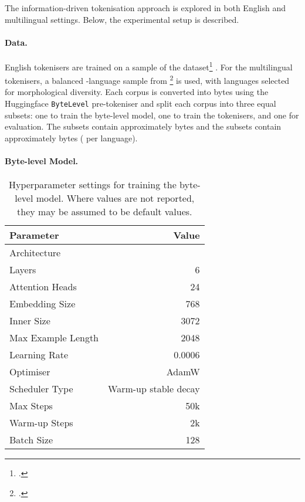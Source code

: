 The information-driven tokenisation approach is explored in both English and multilingual settings. Below, the experimental setup is described.

\paragraph{Data.} 
English tokenisers are trained on a sample of the \fineweb dataset\footnote{\href{https://huggingface.co/datasets/HuggingFaceFW/fineweb-edu}{}.} \citep{penedo2024finewebdatasetsdecantingweb}.
For the multilingual tokenisers, a balanced -language sample from  \commoncorpus \footnote{\href{https://huggingface.co/datasets/PleIAs/common_corpus}{}.} \citep{common_corpus} is used, with languages selected for morphological diversity. Each corpus is converted into bytes using the Huggingface \texttt{ByteLevel} pre-tokeniser and split each corpus into three equal subsets: one to train the byte-level model, one to train the tokenisers, and one for evaluation. The \fineweb subsets contain approximately  bytes and the \commoncorpus subsets contain approximately  bytes ( per language).

\paragraph{Byte-level Model.} 

\begin{table}[t]
    \centering
    \small
    \begin{tabular}{lr}
        \toprule
        Parameter & Value \\
        \midrule
        Architecture & \llama-2 \\
        Layers & 6 \\
        Attention Heads & 24 \\
        Embedding Size & 768 \\
        Inner Size & 3072 \\
        \midrule
        Max Example Length & 2048 \\
        Learning Rate & 0.0006 \\
        Optimiser & AdamW \\
        Scheduler Type & Warm-up stable decay \\
        Max Steps & 50k \\
        Warm-up Steps & 2k \\
        Batch Size & 128 \\
        \bottomrule
    \end{tabular}
    \caption{Hyperparameter settings for training the \llama byte-level model. Where values are not reported, they may be assumed to be default values.}
    \label{tab:16-trainingparams}
\end{table}

